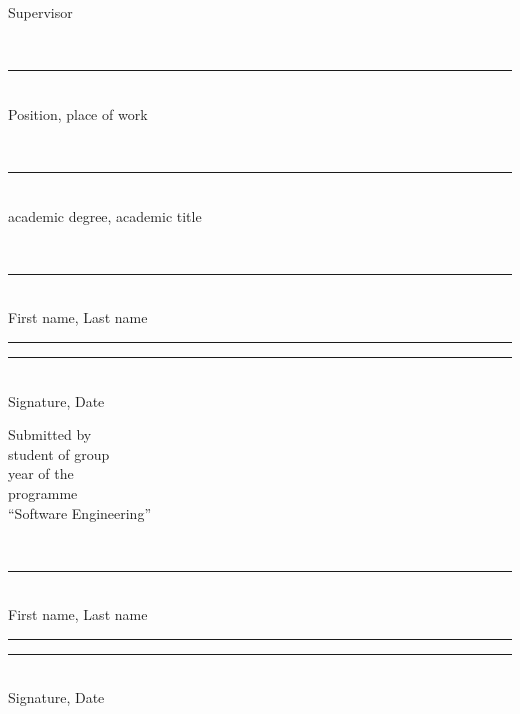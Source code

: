 \begin{titlepage}
\vspace{0.75cm}

\noindent
\begin{minipage}[t]{0.42\textwidth}
\raggedright
Supervisor

\vspace{0.18cm}
\strut\hseSupervisorTitle\\[-0.05cm]
\rule{6.1cm}{0.4pt}\\[-0.05cm]
{\scriptsize Position, place of work}

\vspace{0.08cm}
\strut\hseSupervisorDegree\\[-0.05cm]
\rule{6.1cm}{0.4pt}\\[-0.05cm]
{\scriptsize academic degree, academic title}

\vspace{0.08cm}
\strut\hseSupervisorName\\[-0.05cm]
\rule{6.1cm}{0.4pt}\\[-0.05cm]
{\scriptsize First name, Last name}

\vspace{0.08cm}
\rule{3.6cm}{0.4pt}\quad\rule{2.2cm}{0.4pt}\\[-0.05cm]
{\scriptsize Signature, Date}
\end{minipage}
\hfill
\begin{minipage}[t]{0.42\textwidth}
\raggedright
Submitted by\\
student of group \hseGroup\\
year \hseCourse{} of the \hseDegreeLevel\\
programme\\
\enquote{Software Engineering}

\vspace{0.25cm}
\strut\hseAuthorName\\[-0.05cm]
\rule{6.1cm}{0.4pt}\\[-0.05cm]
{\scriptsize First name, Last name}

\vspace{0.18cm}
\rule{3.6cm}{0.4pt}\quad\rule{2.2cm}{0.4pt}\\[-0.05cm]
{\scriptsize Signature, Date}
\end{minipage}

\ifhseHasCoSupervisor
\vspace{0.35cm}


\end{titlepage}
